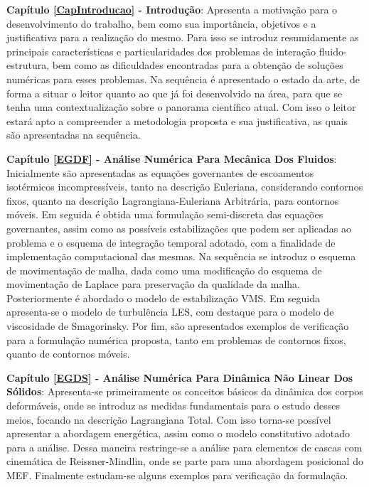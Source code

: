     {
        \newcommand{\Capi}[2]{\textbf{Capítulo #1 - #2}:}

        \Capi{\ref{CapIntroducao}}{Introdução} Apresenta a motivação para o desenvolvimento do trabalho, bem como sua importância, objetivos e a justificativa para a realização do mesmo. Para isso se introduz resumidamente as principais características e particularidades dos problemas de interação fluido-estrutura, bem como as dificuldades encontradas para a obtenção de soluções numéricas para esses problemas. Na sequência é apresentado o estado da arte, de forma a situar o leitor quanto ao que já foi desenvolvido na área, para que se tenha uma contextualização sobre o panorama científico atual. Com isso o leitor estará apto a compreender a metodologia proposta e sua justificativa, as quais são apresentadas na sequência.

        \Capi{\ref{EGDF}}{Análise Numérica Para Mecânica Dos Fluidos} Inicialmente são apresentadas as equações governantes de escoamentos isotérmicos incompressíveis, tanto na descrição Euleriana, considerando contornos fixos, quanto na descrição Lagrangiana-Euleriana Arbitrária, para contornos móveis. Em seguida é obtida uma formulação semi-discreta das equações governantes, assim como as possíveis estabilizações que podem ser aplicadas ao problema e o esquema de integração temporal adotado, com a finalidade de implementação computacional das mesmas. Na sequência se introduz o esquema de movimentação de malha, dada como uma modificação do esquema de movimentação de Laplace para preservação da qualidade da malha. Posteriormente é abordado o modelo de estabilização VMS. Em seguida apresenta-se o modelo de turbulência LES, com destaque para o modelo de viscosidade de Smagorinsky. Por fim, são apresentados exemplos de verificação para a formulação numérica proposta, tanto em problemas de contornos fixos, quanto de contornos móveis.

        \Capi{\ref{EGDS}}{Análise Numérica Para Dinâmica Não Linear Dos Sólidos} Apresenta-se primeiramente os conceitos básicos da dinâmica dos corpos deformáveis, onde se introduz as medidas fundamentais para o estudo desses meios, focando na descrição Lagrangiana Total. Com isso torna-se possível apresentar a abordagem energética, assim como o modelo constitutivo adotado para a análise. Dessa maneira restringe-se a análise para elementos de cascas com cinemática de Reissner-Mindlin, onde se parte para uma abordagem posicional do MEF. Finalmente estudam-se alguns exemplos para verificação da formulação.

}
